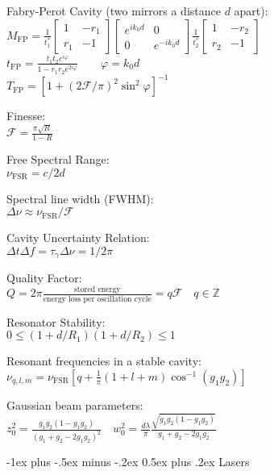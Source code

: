 \documentclass[12pt,landscape]{article}
\makeatletter
\renewcommand{\section}{\@startsection{section}{1}{0mm}%
                                {-1ex plus -.5ex minus -.2ex}%
                                {0.5ex plus .2ex}%
                                {\normalfont\normalsize\bfseries}}
\newcommand{\tab}{\hspace{.02\textwidth}}
\newcommand{\ds}{\displaystyle}
\makeatother
\begin{document}
\begin{multicols}{3}
Fabry-Perot Cavity (two mirrors a distance $d$ apart):\\
\tab $\ds M_\text{FP} = \frac{1}{t_1^{*}}\begin{bmatrix}
	1 & -r_1 \\ r_1 & -1
\end{bmatrix} \begin{bmatrix}
e^{ik_0d} & 0 \\ 0 & e^{-ik_0d}
\end{bmatrix} \frac{1}{t_2^{*}}\begin{bmatrix}
 1 & -r_2 \\ r_2 & -1
\end{bmatrix}$\\
\tab $\ds t_\text{FP} = \frac{t_1t_2e^{i\varphi}}{1 - r_1r_2e^{2i\varphi}} \qquad \varphi = k_0d$\\
\tab $\ds T_\text{FP} = [1 + (2\mathcal{F}/\pi)^2\sin^2\varphi]^{-1}$

Finesse:\\
\tab $\ds \mathcal{F} = \frac{\pi\sqrt{R}}{1 - R}$

Free Spectral Range:\\
\tab $\nu_\text{FSR} = c/2d$

Spectral line width (FWHM):\\
\tab $\Delta \nu \approx \nu_\text{FSR}/\mathcal{F}$

Cavity Uncertainty Relation:\\
\tab $\Delta t \Delta f = \tau_\gamma \Delta\nu = 1/2\pi$

Quality Factor:\\
\tab $Q = 2\pi\frac{\text{stored energy}}{\text{energy loss per oscillation cycle}} = q\mathcal{F} \quad q \in \mathbb{Z}$

Resonator Stability:\\
\tab $0 \leq \left(1 + d/R_1\right)\left(1 + d/R_2\right) \leq 1$

Resonant frequencies in a stable cavity:\\
\tab $\nu_{q,l,m} = \nu_\text{FSR}\left[q + \frac{1}{\pi}(1 + l + m)\cos^{-1}(g_1g_2)\right]$

Gaussian beam parameters:\\
\tab $\ds z_0^2 = \frac{g_1g_2(1-g_1g_2)}{(g_1 + g_2-2g_1g_2)^2} \quad w_0^2 = \frac{d\lambda}{\pi}\frac{\sqrt{g_1g_2(1-g_1g_2)}}{g_1+g_2-2g_1g_2}$

\section{Lasers}


\end{multicols}
\end{document}
